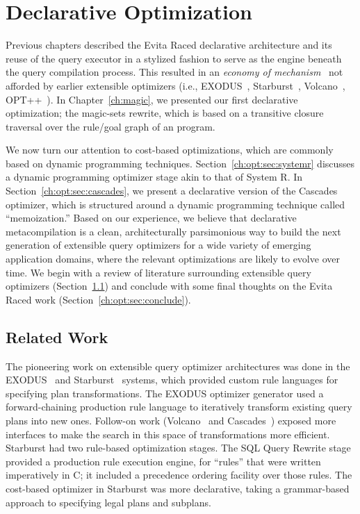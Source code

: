 \chapter[Declarative Optimization]{Declarative Optimization}
\label{ch:opt}

Previous chapters described the Evita Raced declarative architecture and its
reuse of the query executor in a stylized fashion to serve as the engine
beneath the query compilation process.  This resulted in an {\em economy of
mechanism}~\cite{Saltzer75theprotection} not afforded by earlier extensible
optimizers (i.e., EXODUS~\cite{exodus}, Starburst~\cite{phh92},
Volcano~\cite{volcano}, OPT++~\cite{opt++}).  In Chapter~\ref{ch:magic}, we
presented our first declarative optimization; the magic-sets rewrite, which is
based on a transitive closure traversal over the rule/goal graph of an \OVERLOG
program.

We now turn our attention to cost-based optimizations, which are commonly based
on dynamic programming techniques.  Section~\ref{ch:opt:sec:systemr} discusses
a dynamic programming optimizer stage akin to that of System R.  In
Section~\ref{ch:opt:sec:cascades}, we present a declarative version of the
Cascades optimizer, which is structured around a dynamic programming technique
called ``memoization.'' Based on our experience, we believe that declarative
metacompilation is a clean, architecturally parsimonious way to build the next
generation of extensible query optimizers for a wide variety of emerging
application domains, where the relevant optimizations are likely to evolve over
time.  We begin with a review of literature surrounding extensible query
optimizers (Section~\ref{ch:opt:sec:related}) and conclude with some final
thoughts on the Evita Raced work (Section~\ref{ch:opt:sec:conclude}).

\section{Related Work}
\label{ch:opt:sec:related}

The pioneering work on extensible query optimizer architectures was done in the
EXODUS~\cite{exodus} and Starburst~\cite{lohman,phh92} systems, which provided
custom rule languages for specifying plan transformations.  The EXODUS
optimizer generator used a forward-chaining production rule language to iteratively
transform existing query plans into new ones.  Follow-on work
(Volcano~\cite{volcano} and Cascades~\cite{cascades}) exposed more interfaces
to make the search in this space of transformations more efficient.  Starburst
had two rule-based optimization stages.  The SQL Query Rewrite stage provided a
production rule execution engine, for ``rules'' that were written imperatively
in C; it included a precedence ordering facility over those rules.  The
cost-based optimizer in Starburst was more declarative, taking a grammar-based
approach to specifying legal plans and subplans.

